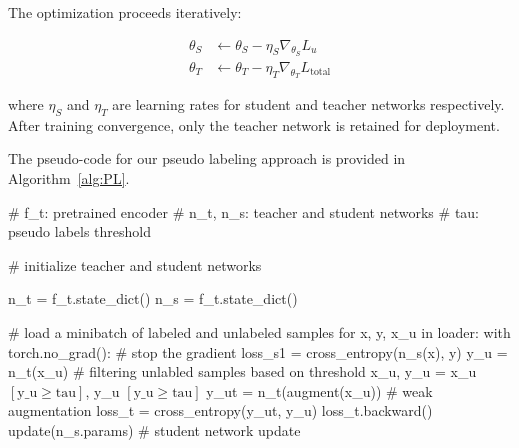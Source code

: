 The optimization proceeds iteratively:

\begin{align}
\theta_S &\leftarrow \theta_S - \eta_S \nabla_{\theta_S} L_u \\
\theta_T &\leftarrow \theta_T - \eta_T \nabla_{\theta_T} L_{\text{total}}
\end{align}

where $\eta_S$ and $\eta_T$ are learning rates for student and teacher networks respectively. After training convergence, only the teacher network is retained for deployment.

The pseudo-code for our pseudo labeling approach is provided in Algorithm~\ref{alg:PL}.

\begin{algorithm}[!htbp]
\caption{Pseudo labeling with RLPL} \label{alg:PL}
\begin{algorithmic}

\State \textcolor{pythoncomment}{\# f\_t: pretrained encoder}
\State \textcolor{pythoncomment}{\# n\_t, n\_s: teacher and student networks}
\State \textcolor{pythoncomment}{\# tau: pseudo labels threshold}

\State \text{}

\State \textcolor{pythoncomment}{\# initialize teacher and student networks}

\State n\_t = f\_t.state\_dict()
\State n\_s = f\_t.state\_dict()

\State \text{}
\State \textcolor{pythoncomment}{\# load a minibatch of labeled and unlabeled samples}
\State  \textcolor{pythonfunction}{for} x, y, x\_u \textcolor{pythonfunction}{in} loader:
\State \hspace{1.1em}	\textcolor{purpleish}{with} torch.no\_grad(): \textcolor{pythoncomment}{\# stop the gradient}
\State \hspace{2.5em} loss\_s1 = cross\_entropy(n\_s(x), y)
\State \hspace{1.1em} y\_u = n\_t(x\_u) 
\State \hspace{1.1em} \textcolor{pythoncomment}{\# filtering unlabled samples based on threshold}
\State \hspace{1.1em} x\_u, y\_u = x\_u $\left[  \text{y\_u} \geq \text{tau}\right]$, y\_u $\left[  \text{y\_u} \geq \text{tau}\right]$
\State \text{}
\State \hspace{1.1em} y\_ut = n\_t(augment(x\_u))  \textcolor{pythoncomment}{\# weak augmentation}
\State \hspace{1.1em} loss\_t = cross\_entropy(y\_ut, y\_u)
\State \hspace{1.1em} loss\_t.backward()
\State \hspace{1.1em} update(n\_s.params) \textcolor{pythoncomment}{\# student network update}


\end{algorithmic}
\end{algorithm}
